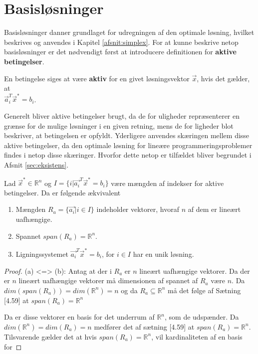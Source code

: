 \section{Basisløsninger}


Basisløsninger danner grundlaget for udregningen af den optimale løsning, hvilket beskrives og anvendes i Kapitel \ref{afsnit:simplex}. For at kunne beskrive netop basisløsninger er det nødvendigt først at introducere definitionen for \textbf{aktive betingelser}.%

\begin{defn}
En betingelse siges at være \textbf{aktiv} for en givet løsningsvektor $\vec{x}$, hvis det gælder, at\\ $\vec{a}_i^T \vec{x}^* = b_i$.
\label{def:aktiv}
\end{defn}

Generelt bliver aktive betingelser brugt, da de for uligheder repræsenterer en grænse for de mulige løsninger i en given retning, mens de for ligheder blot beskriver, at betingelsen er opfyldt.
Yderligere anvendes skæringen mellem disse aktive betingelser, da den optimale løsning for lineære programmeringsproblemer findes i netop disse skæringer. Hvorfor dette netop er tilfældet bliver begrundet i Afsnit \ref{sec:eksistens}.

\begin{stn}
Lad $\vec{x}^* \in \mathds{R}^n$ og $I = \{i | \vec{a_i}^T \vec{x}^* = b_i\}$ være mængden af indekser for aktive betingelser. Da er følgende ækvivalent
\begin{enumerate}[label=(\alph*)]
\item Mængden $R_a =\{\vec{a_i}| i\in I\}$ indeholder vektorer, hvoraf $n$ af dem er lineært uafhængige.
\item Spannet $span(R_a) = \mathds{R}^n$.
\item Ligningssystemet $\vec{a_i}^T \vec{x}^* = b_i$, for $i \in I$ har en unik løsning.
\end{enumerate}
\label{stn:uniklosning}
\end{stn} %

\begin{proof}
	(a) <=> (b): Antag at der i $R_a$ er $n$ lineært uafhængige vektorer. Da der er $n$ lineært uafhængige vektorer må dimensionen af spannet af $R_a$ være $n$. Da $dim(span(R_a))=dim(\mathds{R}^n)=n$ og da $R_a \subseteq \mathds{R}^n$ må det følge af Sætning [4.59] at $span(R_a)=\mathds{R}^n$
	
	
	
	
	Da er disse vektorer en basis for det underrum af $\mathds{R}^n$, som de udspænder. Da $dim(\mathds{R}^n)=dim(R_a)=n$ medfører det af sætning [4.59] at $span(R_a)=\mathds{R}^n$. Tilsvarende gælder det at hvis $span(R_a)=\mathds{R}^n$, vil kardinaliteten af en basis for 
\end{proof}


